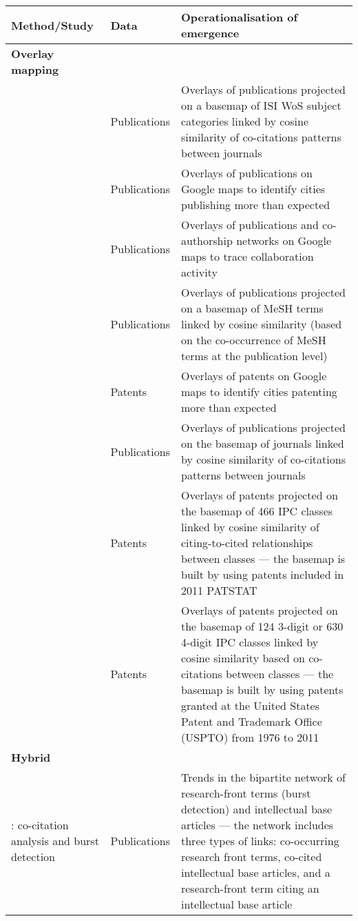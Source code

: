 \documentclass[11pt]{article}
\begin{document}
{\begin{landscape}
\begin{spacing}{0.8}
\begin{longtable}{p{6cm}p{2.7cm}p{13cm}}
\textbf{Method/Study}&			\textbf{Data}&			\textbf{Operationalisation of emergence}\\
\hline
\textbf{Overlay mapping}&  			&  \\
\addtolength{\leftskip}{1em}\noindent		\cite{Rafols2010}&  			Publications&  		Overlays of publications projected on a basemap of ISI WoS subject categories linked by cosine similarity of co-citations patterns between journals\\[1ex]
\addtolength{\leftskip}{1em}\noindent		\cite{Bornmann2011}&  		Publications&  		Overlays of publications on Google maps to identify cities publishing more than expected \\[1ex]
\addtolength{\leftskip}{1em}\noindent		\cite{Leydesdorff2011}& 		Publications& 		Overlays of publications and co-authorship networks on Google maps to trace collaboration activity \\[1ex]
\addtolength{\leftskip}{1em}\noindent		\cite{Leydesdorff2012}&  		Publications&  		Overlays of publications projected on a basemap of MeSH terms linked by cosine similarity (based on the co-occurrence of MeSH terms at the publication level) \\[1ex]
\addtolength{\leftskip}{1em}\noindent		\cite{Leydesdorff2012a}&  	Patents&  			Overlays of patents on Google maps to identify cities patenting more than expected \\[1ex]
\addtolength{\leftskip}{1em}\noindent		\cite{Leydesdorff2013j}&  		Publications&  		Overlays of publications projected on the basemap of journals linked by cosine similarity of co-citations patterns between journals\\[1ex]
\addtolength{\leftskip}{1em}\noindent		\cite{Kay2014}&  			Patents&  			Overlays of patents projected on the basemap of 466 IPC classes linked by cosine similarity of citing-to-cited relationships between classes --- the basemap is built by using patents included in 2011 PATSTAT\\[1ex]
\addtolength{\leftskip}{1em}\noindent		\cite{Leydesdorff2014}&  		Patents&  			Overlays of patents projected on the basemap of 124 3-digit or 630 4-digit IPC classes linked by  cosine similarity based on co-citations between classes --- the basemap is built by using patents granted at the United States Patent and Trademark Office (USPTO) from 1976 to 2011 \\[1ex]


\hline
\textbf{Hybrid}\\


\addtolength{\leftskip}{1em}\noindent		\cite{Chen2006}: co-citation analysis and burst detection&  		Publications&  		Trends in the bipartite network of research-front terms (burst detection) and intellectual base articles --- the network includes three types of links: co-occurring research front terms, co-cited intellectual base articles, and a research-front term citing an intellectual base article \\[1ex]


\end{longtable}
\end{spacing}
\end{landscape}}
\end{document}
